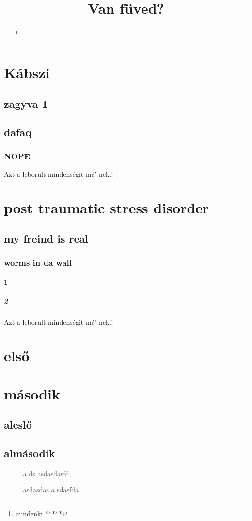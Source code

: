 \documentclass[twoside,12pt]{article}
\title{Van füved?}
\begin{document}
\maketitle
\begin{abstract}
\texttt{\lipsum[3-4]}
\renewcommand{\thefootnote}{\fnsymbol{footnote}}
\footnote{mindenki *****}
\end{abstract}
\setcounter{secnumdepth}{10}
\setcounter{tocdepth}{10}
\renewcommand{\contentsname}{MI FOLYIK ITT GYÖNGYÖSÖN!?}
\tableofcontents
\clearpage
\section{Kábszi}
\subsection{zagyva 1}
\hulipsum[3]
\subsection{dafaq}
\hulipsum[4]
\subsubsection{NOPE}
\hulipsum[1]
\marginparwidth 3cm
\marginparsep 0.5cm
Azt a leborult mindenségit má' neki!
\section[ptsd]{post traumatic stress disorder}
\subsection{my freind is real}
\subsubsection{worms in da wall}
\paragraph{1}
\subparagraph{2}
\marginparwidth 3cm
\marginparsep 0.5cm
Azt a leborult mindenségit má' neki!
\hulipsum[2]
\quote
\lipsum[5-6]
\quotation
\hulipsum[6-7]
\tableofcontents
\appendix
\section{első}
\section{második}
\subsection{aleslő}
\subsection{almásodik}
\begin{verse}
a
ds
asdasdasfd
\newline

asdasdas
a
sdasfda
\end{verse}
\end{document}
